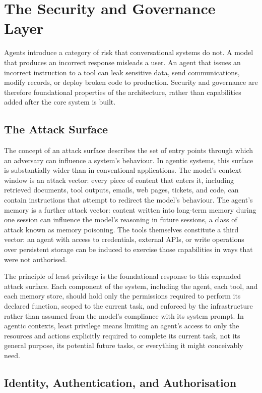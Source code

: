 \chapter{The Security and Governance Layer}

Agents introduce a category of risk that conversational systems do not. A model that
produces an incorrect response misleads a user. An agent that issues an incorrect
instruction to a tool can leak sensitive data, send communications, modify records, or
deploy broken code to production. Security and governance are therefore foundational
properties of the architecture, rather than capabilities added after the core system is
built.

\section{The Attack Surface}

The concept of an attack surface describes the set of entry points through which an
adversary can influence a system's behaviour. In agentic systems, this surface is
substantially wider than in conventional applications. The model's context window is an
attack vector: every piece of content that enters it, including retrieved documents, tool
outputs, emails, web pages, tickets, and code, can contain instructions that attempt to redirect
the model's behaviour. The agent's memory is a further attack vector: content written
into long-term memory during one session can influence the model's reasoning in future
sessions, a class of attack known as memory poisoning. The tools themselves constitute a
third vector: an agent with access to credentials, external APIs, or write operations
over persistent storage can be induced to exercise those capabilities in ways that were
not authorised.

The principle of least privilege is the foundational response to this expanded attack
surface. Each component of the system, including the agent, each tool, and each memory store, should
hold only the permissions required to perform its declared function, scoped to the
current task, and enforced by the infrastructure rather than assumed from the model's
compliance with its system prompt. In agentic contexts, least privilege means limiting
an agent's access to only the resources and actions explicitly required to complete its
current task, not its general purpose, its potential future tasks, or everything it might
conceivably need.

\section{Identity, Authentication, and Authorisation}


